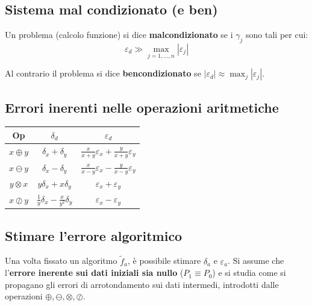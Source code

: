 \documentclass[12pt,a4paper,]{report}
\begin{document}
\subsection{Sistema mal condizionato (e ben)}
\begin{definizione}
    Un problema (calcolo funzione) si dice \textbf{malcondizionato} se i $\gamma_j$ sono tali per cui:
    \[
    \varepsilon_d \gg \max_{j=1,\ldots,n} |\varepsilon_j|
    \]
\end{definizione}
\begin{definizione}
    Al contrario il problema si dice \textbf{bencondizionato} se $|\varepsilon_d| \approx \max_{j} |\varepsilon_j|$.
\end{definizione}

\subsection{Errori inerenti nelle operazioni aritmetiche}

\begin{table}[H]
    \centering
    \begin{tabular}{|c|c|c|}
    \hline
    Op & \textbf{$\delta_d$} & \textbf{$\varepsilon_d$} \\
    \hline
    \textbf{$x \oplus y$} & $\delta_x + \delta_y$ & $\frac{x}{x+y}\varepsilon_x + \frac{y}{x+y} \varepsilon_y$ \\
    \hline
    \textbf{$x \ominus y$} & $\delta_x - \delta_y$ & $\frac{x}{x-y}\varepsilon_x - \frac{y}{x-y} \varepsilon_y$ \\
    \hline
    $y \otimes x $ & $y\delta_x + x\delta_y$ & $\varepsilon_x + \varepsilon_y$ \\
    \hline
    \textbf{$x \oslash y$} & $\frac{1}{y}\delta_x - \frac{x}{y^2}\delta_y$ & $\varepsilon_x - \varepsilon_y$  \\
    \hline
    \end{tabular}
\end{table}

\subsection{Stimare l'errore algoritmico}
Una volta fissato un algoritmo $\tilde{f}_a$, è possibile stimare $\delta_a$ e
$\varepsilon_a$. Si assume che l'\textbf{errore inerente sui dati iniziali sia
nullo} ($P_1 \equiv P_0$) e si studia come si propagano gli errori di
arrotondamento sui dati intermedi, introdotti dalle operazioni
$\oplus, \ominus, \otimes, \oslash$.
\end{document}
